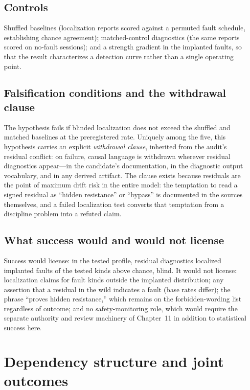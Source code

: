 \subsection{Controls}

Shuffled baselines (localization reports scored against a permuted fault schedule, establishing chance agreement); matched-control diagnostics (the same reports scored on no-fault sessions); and a strength gradient in the implanted faults, so that the result characterizes a detection curve rather than a single operating point.

\subsection{Falsification conditions and the withdrawal clause}

The hypothesis fails if blinded localization does not exceed the shuffled and matched baselines at the preregistered rate. Uniquely among the five, this hypothesis carries an explicit \emph{withdrawal clause}, inherited from the audit's residual conflict: on failure, causal language is withdrawn wherever residual diagnostics appear---in the candidate's documentation, in the diagnostic output vocabulary, and in any derived artifact. The clause exists because residuals are the point of maximum drift risk in the entire model: the temptation to read a signed residual as ``hidden resistance'' or ``bypass'' is documented in the sources themselves, and a failed localization test converts that temptation from a discipline problem into a refuted claim.

\subsection{What success would and would not license}

Success would license: in the tested profile, residual diagnostics localized implanted faults of the tested kinds above chance, blind. It would not license: localization claims for fault kinds outside the implanted distribution; any assertion that a residual in the wild indicates a fault (base rates differ); the phrase ``proves hidden resistance,'' which remains on the forbidden-wording list regardless of outcome; and no safety-monitoring role, which would require the separate authority and review machinery of Chapter~11 in addition to statistical success here.

\section{Dependency structure and joint outcomes}\label{hyp:sec:joint}


